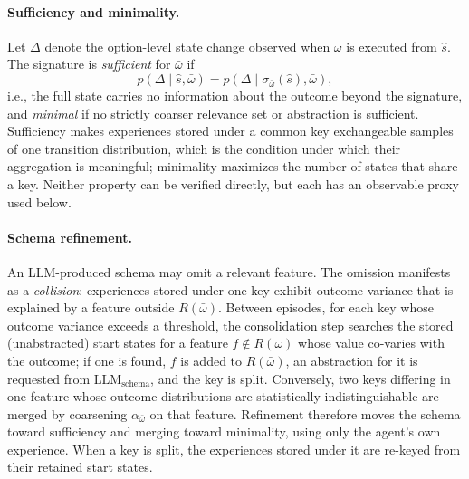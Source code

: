 \documentclass[11pt]{article}
\newcommand{\llm}[1]{\mathrm{LLM}_{\mathrm{#1}}}
\newcommand{\Rel}{R}
\newcommand{\shat}{\hat{s}}
\begin{document}
\paragraph{Sufficiency and minimality.}
Let $\Delta$ denote the option-level state change observed when $\bar\omega$ is executed from $\shat$. The signature is \emph{sufficient} for $\bar\omega$ if
\begin{equation}
p(\Delta\mid\shat,\bar\omega)=p(\Delta\mid\sigma_{\bar\omega}(\shat),\bar\omega),
\label{eq:sufficient}
\end{equation}
i.e., the full state carries no information about the outcome beyond the signature, and \emph{minimal} if no strictly coarser relevance set or abstraction is sufficient. Sufficiency makes experiences stored under a common key exchangeable samples of one transition distribution, which is the condition under which their aggregation is meaningful; minimality maximizes the number of states that share a key. Neither property can be verified directly, but each has an observable proxy used below.

\paragraph{Schema refinement.}
An LLM-produced schema may omit a relevant feature. The omission manifests as a \emph{collision}: experiences stored under one key exhibit outcome variance that is explained by a feature outside $\Rel(\bar\omega)$. Between episodes, for each key whose outcome variance exceeds a threshold, the consolidation step searches the stored (unabstracted) start states for a feature $f\notin\Rel(\bar\omega)$ whose value co-varies with the outcome; if one is found, $f$ is added to $\Rel(\bar\omega)$, an abstraction for it is requested from $\llm{schema}$, and the key is split. Conversely, two keys differing in one feature whose outcome distributions are statistically indistinguishable are merged by coarsening $\alpha_{\bar\omega}$ on that feature. Refinement therefore moves the schema toward sufficiency and merging toward minimality, using only the agent's own experience. When a key is split, the experiences stored under it are re-keyed from their retained start states.
\end{document}
